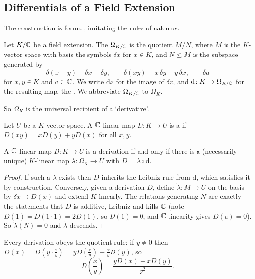 \documentclass[a4paper]{scrartcl}
\newcommand{\dee}{\mathrm{d}}
\begin{document}
\subsection{Differentials of a Field Extension}

The construction is formal, imitating the rules of calculus.

\begin{definition}
	Let $K/\mathbb{C}$ be a field extension. The  $\Omega_{K/\mathbb{C}}$ is the quotient $M/N$, where $M$ is the $K$-vector space with basis the symbols $\delta x$ for $x \in K$, and $N \leq M$ is the subspace generated by
	$$\delta(x+y) - \delta x - \delta y, \qquad \delta(xy) - x\,\delta y - y\,\delta x, \qquad \delta a$$
	for $x,y \in K$ and $a \in \mathbb{C}$. We write $\dee x$ for the image of $\delta x$, and $\dee \colon K \to \Omega_{K/\C}$ for the resulting map, the . We abbreviate $\Omega_{K/\mathbb{C}}$ to $\Omega_K$.
\end{definition}

So $\Omega_K$ is the universal recipient of a `derivative'.

\begin{definition}[Derivation]
	Let $U$ be a $K$-vector space. A $\mathbb{C}$-linear map $D \colon K \to U$ is a  if $D(xy) = xD(y) + yD(x)$ for all $x,y$.
\end{definition}

\begin{lemma}\label{lem:univderiv}
	A $\mathbb{C}$-linear map $D \colon K \to U$ is a derivation if and only if there is a (necessarily unique) $K$-linear map $\lambda \colon \Omega_K \to U$ with $D = \lambda\circ\dee$.
\end{lemma}

\begin{proof}
	If such a $\lambda$ exists then $D$ inherits the Leibniz rule from $\dee$, which satisfies it by construction. Conversely, given a derivation $D$, define $\tilde\lambda \colon M \to U$ on the basis by $\delta x \mapsto D(x)$ and extend $K$-linearly. The relations generating $N$ are exactly the statements that $D$ is additive, Leibniz and kills $\mathbb{C}$ (note $D(1) = D(1\cdot1) = 2D(1)$, so $D(1) = 0$, and $\mathbb{C}$-linearity gives $D(a) = 0$). So $\tilde\lambda(N) = 0$ and $\tilde\lambda$ descends.
\end{proof}

\begin{remark}
	Every derivation obeys the quotient rule: if $y \neq 0$ then $D(x) = D(y\cdot\frac xy) = yD(\frac xy) + \frac xy D(y)$, so
	$$D\!\left(\frac xy\right) = \frac{yD(x) - xD(y)}{y^2}.$$
\end{remark}
\end{document}
